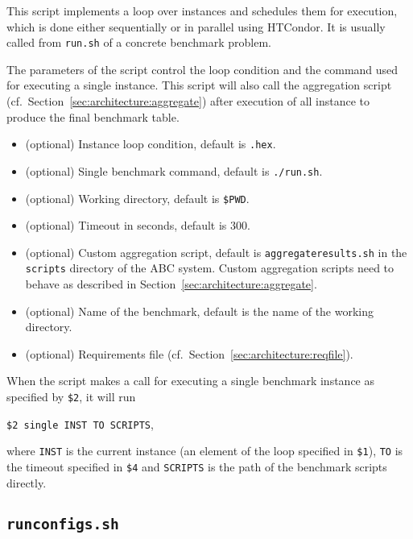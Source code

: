 \documentclass[a4paper]{article}
\newcommand{\abcs}{{ABC}}
\begin{document}
		    This script implements a loop over instances and schedules them for execution,
		    which is done either sequentially or in parallel using HTCondor.
		    It is usually called from {\tt run.sh} of a concrete benchmark problem.
		    
		    The parameters of the script control the loop condition
		    and the command used for executing a single instance.
		    This script will also call the aggregation script (cf.~Section~\ref{sec:architecture:aggregate})
		    after execution of all instance
		    to produce the final benchmark table.
				
		    \medskip{}
		    \begin{itemize}
				\item[{\tt \$1}:] (optional) Instance loop condition, default is {\tt *.hex}.
				\item[{\tt \$2}:] (optional) Single benchmark command, default is {\tt ./run.sh}.
				\item[{\tt \$3}:] (optional) Working directory, default is {\tt \$PWD}.
				\item[{\tt \$4}:] (optional) Timeout in seconds, default is {\tt $300$}.
				\item[{\tt \$5}:] (optional) Custom aggregation script, default is {\tt aggregateresults.sh}
					in the {\tt scripts} directory of the \abcs{} system.
					Custom aggregation scripts need to behave as described in Section~\ref{sec:architecture:aggregate}.
				\item[{\tt \$6}:] (optional) Name of the benchmark, default is the name of the working directory.
				\item[{\tt \$7}:] (optional) Requirements file (cf.~Section~\ref{sec:architecture:reqfile}).
		    \end{itemize}
		 
		 	When the script makes a call for executing a single benchmark instance
		 	as specified by {\tt \$2}, it will run
		 	\begin{center}
		 		{\tt \$2 single INST TO SCRIPTS},
		 	\end{center}
		 	where {\tt INST} is the current instance (an element of the loop specified in {\tt \$1}),
		 	{\tt TO} is the timeout specified in {\tt \$4}
		 	and {\tt SCRIPTS} is the path of the benchmark scripts directly.
				
		\subsection{\tt runconfigs.sh}
		\label{sec:architecture:runconfigs}
		
\end{document}
